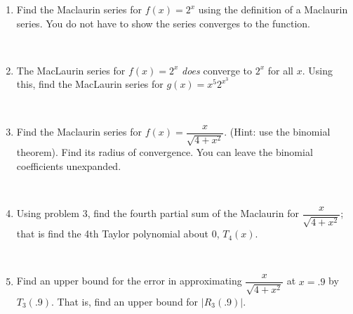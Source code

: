 \documentclass[11pt, oneside]{article}   	%
\title{}
\author{Week 13 discussion problems}
\date{}							%
\begin{document}
\maketitle

\begin{enumerate}
\item Find the Maclaurin series for $f(x)=2^x$ using the definition of a Maclaurin series. You do not have to show the series converges to the function.

\

\item The MacLaurin series for $f(x)=2^x$ \emph{does} converge to $2^x$ for all $x$. Using this, find the MacLaurin series for 
 $g(x)=x^5 2^{x^3}$

\

\item Find the Maclaurin series for $f(x)=\dfrac{x}{\sqrt{4+x^2}}$. (Hint: use the binomial theorem). Find its radius of convergence. You can leave the binomial coefficients unexpanded.

\

\item Using problem 3, find the fourth partial sum of the Maclaurin for $\dfrac{x}{\sqrt{4+x^2}}$; that is find the 4th Taylor polynomial about $0$, $T_4(x)$.

\

\item Find an upper bound for the error in approximating $\dfrac{x}{\sqrt{4+x^2}}$ at $x=.9$ by $T_3(.9)$. That is, find an upper bound for $\left| R_3(.9) \right|$.


\end{enumerate}
\end{document}
